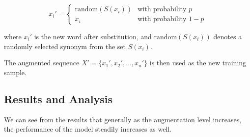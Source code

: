 \documentclass{article}
\begin{document}
\[
  x_i' =
  \begin{cases}
    \text{random}(S(x_i)) & \text{with probability } p     \\
    x_i                   & \text{with probability } 1 - p
  \end{cases}
\]

where \( x_i' \) is the new word after substitution, and
\(\text{random}(S(x_i))\) denotes a randomly selected synonym from the set \(
S(x_i) \).

The augmented sequence \( X' = \{x_1', x_2', \ldots, x_n'\} \) is then used as
the new training sample.

\subsection{Results and Analysis}

We can see from the results that generally as the augmentation level increases,
the performance of the model steadily increases as well.
\end{document}
